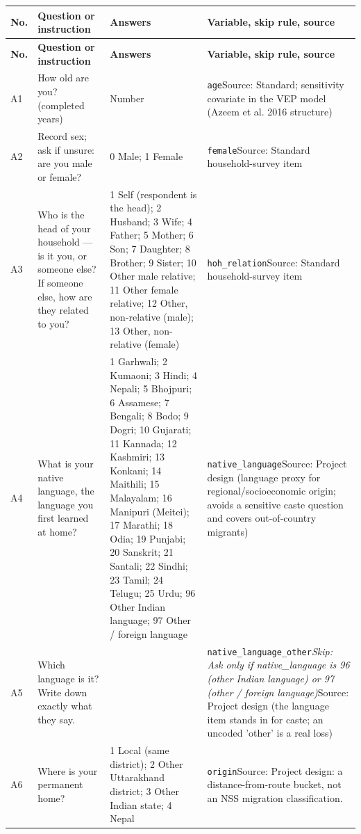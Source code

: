 \documentclass[10pt]{article}
\begin{document}
{\scriptsize
\begin{longtable}{p{0.8cm}p{6.4cm}p{3.6cm}p{5.8cm}}
\toprule
\textbf{No.} & \textbf{Question or instruction} & \textbf{Answers} & \textbf{Variable, skip rule, source} \\
\midrule
\endfirsthead
\toprule
\textbf{No.} & \textbf{Question or instruction} & \textbf{Answers} & \textbf{Variable, skip rule, source} \\
\midrule
\endhead
A1 & How old are you? (completed years) & Number & \texttt{age}\newline Source: Standard; sensitivity covariate in the VEP model (Azeem et al. 2016 structure) \\
A2 & Record sex; ask if unsure: are you male or female? & 0 Male; 1 Female & \texttt{female}\newline Source: Standard household-survey item \\
A3 & Who is the head of your household — is it you, or someone else? If someone else, how are they related to you? & 1 Self (respondent is the head); 2 Husband; 3 Wife; 4 Father; 5 Mother; 6 Son; 7 Daughter; 8 Brother; 9 Sister; 10 Other male relative; 11 Other female relative; 12 Other, non-relative (male); 13 Other, non-relative (female) & \texttt{hoh\_relation}\newline Source: Standard household-survey item \\
A4 & What is your native language, the language you first learned at home? & 1 Garhwali; 2 Kumaoni; 3 Hindi; 4 Nepali; 5 Bhojpuri; 6 Assamese; 7 Bengali; 8 Bodo; 9 Dogri; 10 Gujarati; 11 Kannada; 12 Kashmiri; 13 Konkani; 14 Maithili; 15 Malayalam; 16 Manipuri (Meitei); 17 Marathi; 18 Odia; 19 Punjabi; 20 Sanskrit; 21 Santali; 22 Sindhi; 23 Tamil; 24 Telugu; 25 Urdu; 96 Other Indian language; 97 Other / foreign language & \texttt{native\_language}\newline Source: Project design (language proxy for regional/socioeconomic origin; avoids a sensitive caste question and covers out-of-country migrants) \\
A5 & Which language is it? Write down exactly what they say. &  & \texttt{native\_language\_other}\newline \textit{Skip: Ask only if native\_language is 96 (other Indian language) or 97 (other / foreign language)}\newline Source: Project design (the language item stands in for caste; an uncoded 'other' is a real loss) \\
A6 & Where is your permanent home? & 1 Local (same district); 2 Other Uttarakhand district; 3 Other Indian state; 4 Nepal & \texttt{origin}\newline Source: Project design: a distance-from-route bucket, not an NSS migration classification. \\

\end{longtable}}
\end{document}
